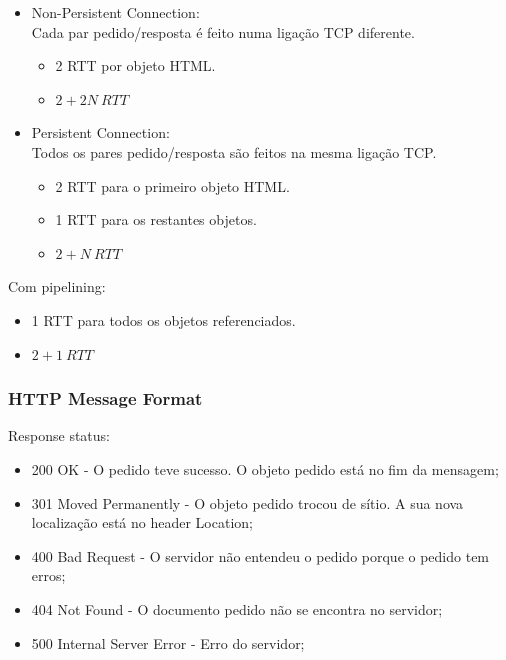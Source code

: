 \documentclass[12pt]{article}
\begin{document}
\begin{itemize}
    \item Non-Persistent Connection: \\
        Cada par pedido/resposta é feito numa ligação TCP diferente.
        \begin{itemize}[topsep=0pt]
            \item 2 RTT por objeto HTML. 
            \item $2+2N\ RTT$
        \end{itemize}
    \item Persistent Connection: \\
        Todos os pares pedido/resposta são feitos na mesma ligação TCP.
        \begin{itemize}[topsep=0pt, itemsep=0pt]
            \item 2 RTT para o primeiro objeto HTML.
            \item 1 RTT para os restantes objetos.
            \item $2+N\ RTT$
        \end{itemize}
\end{itemize}

Com pipelining:

\begin{itemize}[topsep=0pt, itemsep=0pt]
    \item 1 RTT para todos os objetos referenciados.
    \item $2+1\ RTT$
\end{itemize}

\subsubsection{HTTP Message Format}

Response status:
\begin{itemize}
    \item 200 OK - O pedido teve sucesso. O objeto pedido está no fim da mensagem;
    \item 301 Moved Permanently - O objeto pedido trocou de sítio. A sua nova localização está no header Location;
    \item 400 Bad Request - O servidor não entendeu o pedido porque o pedido tem erros;
    \item 404 Not Found - O documento pedido não se encontra no servidor;
    \item 500 Internal Server Error - Erro do servidor;

\end{itemize}
\end{document}
